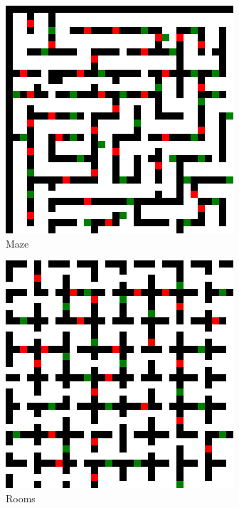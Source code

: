 \documentclass[letterpaper]{article} %
\def\
UrlFont{\rm}  %
\theoremstyle{definition}
\begin{document}
\begin{figure}[t]
        \centering    
    \begin{subfigure}[b]{0.32\columnwidth}\centering  
      \includegraphics[scale=0.3]{Figures/maze-32-32-2.map.png}
      \caption{Maze}
    \end{subfigure}
    \begin{subfigure}[b]{0.32\columnwidth}\centering  
      \includegraphics[scale=.3]{Figures/room-32-32-4.map.png}
      \caption{Rooms}
    \end{subfigure}
    \begin{subfigure}[b]{0.32\columnwidth}\centering  

\end{subfigure}
\end{figure}
\end{document}
